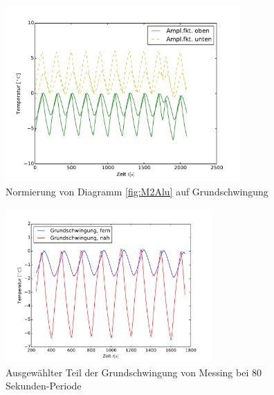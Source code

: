 \begin{figure}[h]
	\label{fig:M2MessingNorm}
	\centering
	\includegraphics[width=0.8\textwidth]{Bilder/Normierungsauswahl/M2_Alu_norm.pdf}
	\caption{Normierung von Diagramm \ref{fig:M2Alu} auf Grundschwingung}
\end{figure}
\begin{figure}[h]
	\label{fig:M2MessingNormkurve}
	\centering
	\includegraphics[width=0.7\textwidth]{Bilder/M2_Messing_norm.pdf}
	\caption{Ausgewählter Teil der Grundschwingung von Messing bei 80 Sekunden-Periode}
\end{figure}
